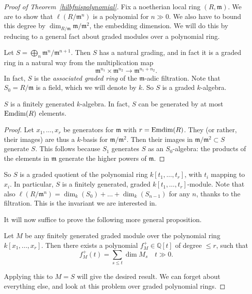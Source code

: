 \begin{proof}[Proof of  Theorem~\ref{hilbfnispolynomial}]
Fix a noetherian local ring $(R, \mathfrak{m})$. We are to show that
$\ell(R/\mathfrak{m}^n)$ is a polynomial for $n \gg 0$. We also have to bound
this degree by $\dim_{R/\mathfrak{m}} \mathfrak{m}/\mathfrak{m}^2$, the
embedding dimension. We will do this by reducing to a general fact about
graded modules over a polynomial ring.

Let $S = \bigoplus_n  \mathfrak{m}^n/\mathfrak{m}^{n+1}$. Then $S$ has a
natural grading, and in fact it is a graded ring in a natural way from the
multiplication map 
\[ \mathfrak{m}^{n_1} \times \mathfrak{m}^{n_2} \to \mathfrak{m}^{n_1 + n_2}.  \]
In fact, $S$ is the \emph{associated graded ring} of the $\mathfrak{m}$-adic filtration.
Note that $S_0 = R/\mathfrak{m}$ is a field, which we will denote by  $k$.
So $S$ is a graded $k$-algebra.

\begin{lemma} 
$S$ is a finitely generated $k$-algebra. In fact, $S$ can be generated by at
most $\operatorname{Emdim}(R)$ elements.
\end{lemma} 
\begin{proof} 
Let $x_1, \dots, x_r$ be generators for $\mathfrak{m} $ with $r = \operatorname{Emdim}(R)$.
They  (or rather, their images) are thus a $k$-basis
for $\mathfrak{m}/\mathfrak{m}^2$.
Then their images in $\mathfrak{m}/\mathfrak{m}^2 \subset S$ generate $S$.
This follows because $S_1$ generates $S$ as an $S_0$-algebra: the products of
the elements in $\mathfrak{m}$ generate the higher powers of $\mathfrak{m}$.
\end{proof} 

So $S$ is a graded quotient of the polynomial ring $k[t_1, \dots, t_r]$, with
$t_i $ mapping to $x_i$. In particular, $S$ is a finitely generated, graded $k[t_1,
\dots, t_r]$-module.
Note that also $\ell(R/\mathfrak{m}^n)  = \dim_{k}(S_0) + \dots +
\dim_{k}(S_{n-1})$ for any $n$, thanks to the filtration. This is the
invariant we are interested in.

It will now suffice to prove the following more general proposition.
\begin{proposition} \label{hilbfngeneral}
Let $M$ be any finitely generated graded module over the polynomial ring
$k[x_1, \dots, x_r]$. Then
there exists a polynomial $f_M^+ \in \mathbb{Q}[t]$ of degree $ \leq r$, such that
\[ f_M^+(t) = \sum_{s \leq t} \dim M_s \quad t \gg 0.   \]
\end{proposition} 
Applying this to $M = S$ will give the desired result. We can forget about
everything else, and look at this problem over graded polynomial rings.


\end{proof}
